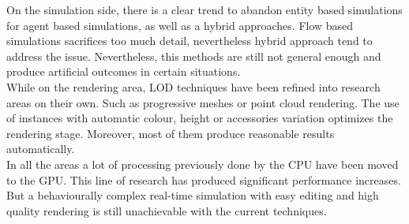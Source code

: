 \documentclass[6pt]{article} %
\begin{document}
\begin{multicols}{2}
On the simulation side, there is a clear trend to abandon entity based simulations for agent based simulations, as well as a hybrid approaches.
Flow based simulations sacrifices too much detail, nevertheless hybrid approach tend to address the issue.
Nevertheless, this methods are still not general enough and produce artificial outcomes in certain situations.\\

While on the rendering area, LOD techniques have been refined into research areas on their own.
Such as progressive meshes or point cloud rendering.
The use of instances with automatic colour, height or accessories variation optimizes the rendering stage.
Moreover, most of them produce reasonable results automatically.\\

In all the areas a lot of processing previously done by the CPU have been moved to the GPU.
This line of research has produced significant performance increases.
But a behaviourally complex real-time simulation with easy editing and high quality rendering is still unachievable with the current techniques.

\end{multicols}
\end{document}
